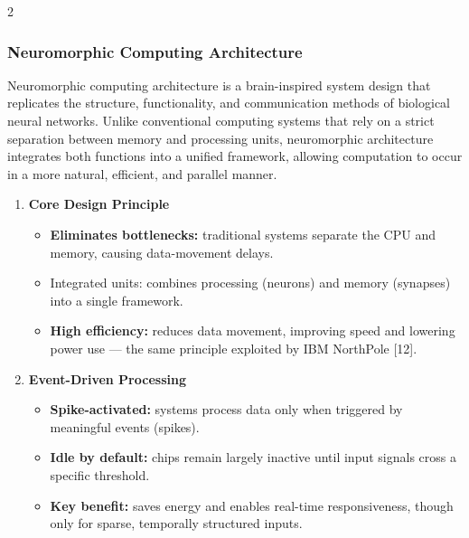 \begin{multicols}{2}
  \subsubsection*{Neuromorphic Computing Architecture}
  Neuromorphic computing architecture is a brain-inspired system design that replicates the structure, functionality, and communication methods of biological neural networks. Unlike conventional computing systems that rely on a strict separation between memory and processing units, neuromorphic architecture integrates both functions into a unified framework, allowing computation to occur in a more natural, efficient, and parallel manner.
  \begin{enumerate}\justifying
    \item \textbf{Core Design Principle}
      \begin{itemize}
        \item \textbf{Eliminates bottlenecks:} traditional systems separate the CPU and memory, causing data-movement delays.
        \item Integrated units: combines processing (neurons) and memory (synapses) into a single framework.
        \item \textbf{High efficiency:} reduces data movement, improving speed and lowering power use — the same principle exploited by IBM NorthPole [12].
      \end{itemize}
    \item \textbf{Event-Driven Processing}
      \begin{itemize}
        \item \textbf{Spike-activated:} systems process data only when triggered by meaningful events (spikes).
        \item \textbf{Idle by default:} chips remain largely inactive until input signals cross a specific threshold.
        \item \textbf{Key benefit:} saves energy and enables real-time responsiveness, though only for sparse, temporally structured inputs.
      \end{itemize}


\end{enumerate}
\end{multicols}

